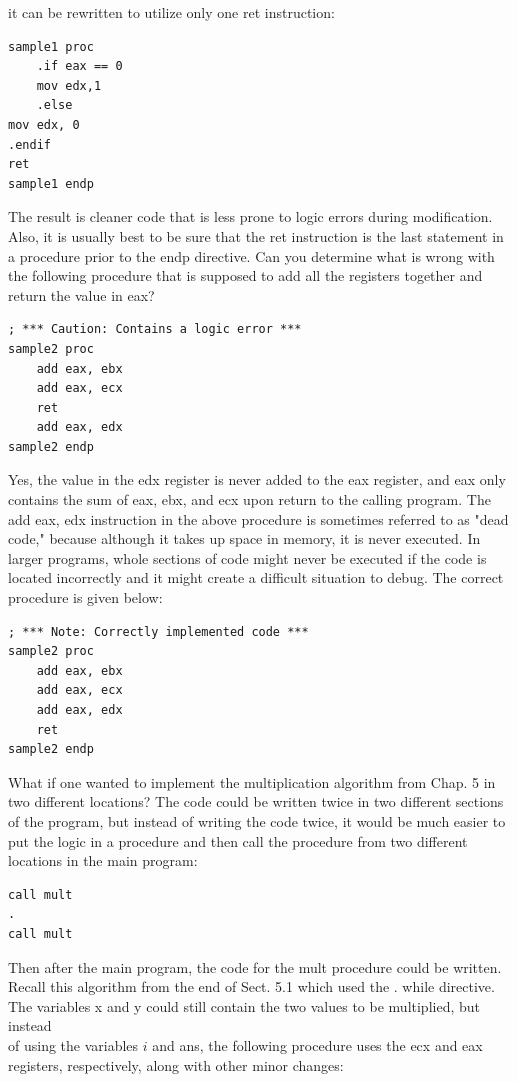 \documentclass[10pt]{book}
\begin{document}
\begin{center}
\begin{center}
it can be rewritten to utilize only one ret instruction:

\begin{verbatim}
sample1 proc
    .if eax == 0
    mov edx,1
    .else
mov edx, 0
.endif
ret
sample1 endp
\end{verbatim}

The result is cleaner code that is less prone to logic errors during modification. Also, it is usually best to be sure that the ret instruction is the last statement in a procedure prior to the endp directive. Can you determine what is wrong with the following procedure that is supposed to add all the registers together and return the value in eax?

\begin{verbatim}
; *** Caution: Contains a logic error ***
sample2 proc
    add eax, ebx
    add eax, ecx
    ret
    add eax, edx
sample2 endp
\end{verbatim}

Yes, the value in the edx register is never added to the eax register, and eax only contains the sum of eax, ebx, and ecx upon return to the calling program. The add eax, edx instruction in the above procedure is sometimes referred to as "dead code," because although it takes up space in memory, it is never executed. In larger programs, whole sections of code might never be executed if the code is located incorrectly and it might create a difficult situation to debug. The correct procedure is given below:

\begin{verbatim}
; *** Note: Correctly implemented code ***
sample2 proc
    add eax, ebx
    add eax, ecx
    add eax, edx
    ret
sample2 endp
\end{verbatim}

What if one wanted to implement the multiplication algorithm from Chap. 5 in two different locations? The code could be written twice in two different sections of the program, but instead of writing the code twice, it would be much easier to put the logic in a procedure and then call the procedure from two different locations in the main program:

\begin{verbatim}
call mult
.
call mult
\end{verbatim}

Then after the main program, the code for the mult procedure could be written. Recall this algorithm from the end of Sect. 5.1 which used the . while directive. The variables x and y could still contain the two values to be multiplied, but instead\\
of using the variables $i$ and ans, the following procedure uses the ecx and eax registers, respectively, along with other minor changes:



\end{center}
\end{center}
\end{document}
